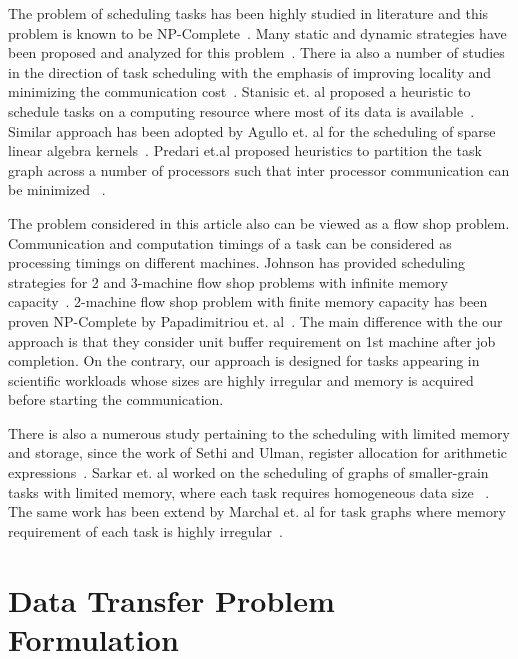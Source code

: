 \documentclass[sigconf]{acmart}
\begin{document}
The problem of scheduling tasks has been highly studied in literature and this problem is known to be NP-Complete~\cite{GareyJohnson}.  Many static and dynamic strategies have been proposed and analyzed for this problem~\cite{heft-Topcuoglu,hipc16multiresource,ipdps16starpu}. There ia also a number of studies in the direction of task scheduling with the emphasis of improving locality and minimizing the communication cost~\cite{starpu,heft-Topcuoglu}. Stanisic et. al proposed a heuristic to schedule tasks on a computing resource where most of its data is available~\cite{luka-dmdar}. Similar approach has been adopted by Agullo et. al for the scheduling of sparse linear algebra kernels~\cite{agullo_fmm}.  Predari et.al  proposed  heuristics to  partition the task graph across a number of processors such that inter processor communication can be minimized ~\cite{predari:tel-01518956}.

The problem considered in this article also can be viewed as a flow shop problem. Communication and computation timings of a task can be considered as processing timings on different machines.  Johnson has provided scheduling strategies for 2 and 3-machine flow shop problems with infinite memory capacity~\cite{johnson}. 2-machine flow shop problem with finite memory capacity has been proven NP-Complete by Papadimitriou et. al~\cite{Papadimitriou:1980:FSL:322203.322213}. The main difference with the our approach is that they consider unit buffer requirement on 1st machine after job completion. On the contrary, our approach is designed for tasks appearing in scientific workloads whose sizes are highly irregular and memory is acquired before starting the communication.

There is also a numerous study pertaining to the scheduling with limited memory and storage, since the work of Sethi and Ulman, register allocation for arithmetic expressions~\cite{Sethi:1970:GOC:321607.321620}.  Sarkar et. al  worked on the scheduling of graphs of smaller-grain tasks with limited memory, where each task requires homogeneous data size ~\cite{vsarkar-pact}. The same work has been extend by Marchal et. al for task graphs where memory requirement of each task is highly irregular~\cite{loris-ipdps18}.



\section{Data Transfer Problem Formulation}
\label{sec:theoreticalProof}
\end{document}
